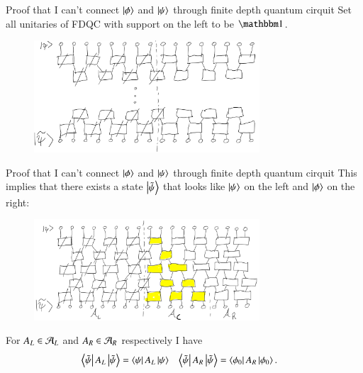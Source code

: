 \documentclass{beamer}
\begin{document}
\begin{frame}{Proof that I can't connect $\ket{\phi}$ and $\ket{\psi}$ through finite depth quantum cirquit}
	Set all unitaries of FDQC with support on the left to be $\id$.
	\begin{figure}
		\center
		\includegraphics[width=0.75\textwidth]{Figures/ConnectingPsiAndPsi0Proof2.png}
	\end{figure}
\end{frame}

\begin{frame}{Proof that I can't connect $\ket{\phi}$ and $\ket{\psi}$ through finite depth quantum cirquit}
	This implies that there exists a state $\ket{\tilde\psi}$ that looks like $\ket{\psi}$ on the left and $\ket{\phi}$ on the right:
	\begin{figure}
		\center
		\includegraphics[width=0.75\textwidth]{Figures/ConnectingPsiAndPsi0Proof2_WithLightcone.png}
	\end{figure}
	\pause
	For $A_L\in\AA_L$ and $A_R\in\AA_R$ respectively I have
	\begin{align}
		\bra{\tilde\psi}A_L\ket{\tilde{\psi}}&=\bra{\psi}A_L\ket{\psi}&\bra{\tilde\psi}A_R\ket{\tilde{\psi}}&=\bra{\phi_0}A_R\ket{\phi_0}.
	\end{align}
\end{frame}
\end{document}

